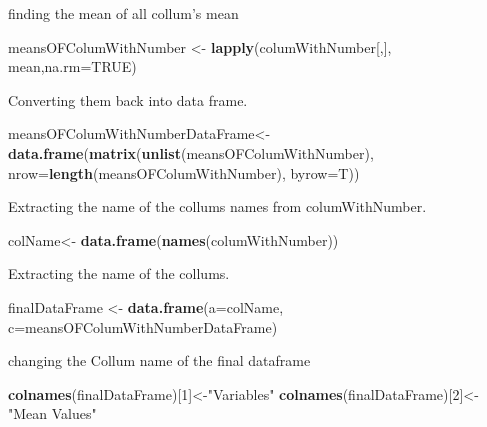 \documentclass[]{book}
\newenvironment{Shaded}{\begin{snugshade}}{\end{snugshade}}
\newcommand{\DataTypeTok}[1]{\textcolor[rgb]{0.13,0.29,0.53}{#1}}
\newcommand{\DecValTok}[1]{\textcolor[rgb]{0.00,0.00,0.81}{#1}}
\newcommand{\KeywordTok}[1]{\textcolor[rgb]{0.13,0.29,0.53}{\textbf{#1}}}
\newcommand{\NormalTok}[1]{#1}
\newcommand{\OtherTok}[1]{\textcolor[rgb]{0.56,0.35,0.01}{#1}}
\newcommand{\StringTok}[1]{\textcolor[rgb]{0.31,0.60,0.02}{#1}}
\begin{document}
finding the mean of all collum's mean

\begin{Shaded}
\begin{Highlighting}[]
\NormalTok{meansOFColumWithNumber <-}\StringTok{ }\KeywordTok{lapply}\NormalTok{(columWithNumber[,], mean,}\DataTypeTok{na.rm=}\OtherTok{TRUE}\NormalTok{)}
\end{Highlighting}
\end{Shaded}

Converting them back into data frame.

\begin{Shaded}
\begin{Highlighting}[]
\NormalTok{meansOFColumWithNumberDataFrame<-}\KeywordTok{data.frame}\NormalTok{(}\KeywordTok{matrix}\NormalTok{(}\KeywordTok{unlist}\NormalTok{(meansOFColumWithNumber), }\DataTypeTok{nrow=}\KeywordTok{length}\NormalTok{(meansOFColumWithNumber), }\DataTypeTok{byrow=}\NormalTok{T))}
\end{Highlighting}
\end{Shaded}

Extracting the name of the collums names from columWithNumber.

\begin{Shaded}
\begin{Highlighting}[]
\NormalTok{colName<-}\StringTok{ }\KeywordTok{data.frame}\NormalTok{(}\KeywordTok{names}\NormalTok{(columWithNumber))}
\end{Highlighting}
\end{Shaded}

Extracting the name of the collums.

\begin{Shaded}
\begin{Highlighting}[]
\NormalTok{finalDataFrame <-}\StringTok{ }\KeywordTok{data.frame}\NormalTok{(}\DataTypeTok{a=}\NormalTok{colName, }\DataTypeTok{c=}\NormalTok{meansOFColumWithNumberDataFrame)}
\end{Highlighting}
\end{Shaded}

changing the Collum name of the final dataframe

\begin{Shaded}
\begin{Highlighting}[]
\KeywordTok{colnames}\NormalTok{(finalDataFrame)[}\DecValTok{1}\NormalTok{]<-}\StringTok{"Variables"}
\KeywordTok{colnames}\NormalTok{(finalDataFrame)[}\DecValTok{2}\NormalTok{]<-}\StringTok{"Mean Values"}
\end{Highlighting}
\end{Shaded}
\end{document}
